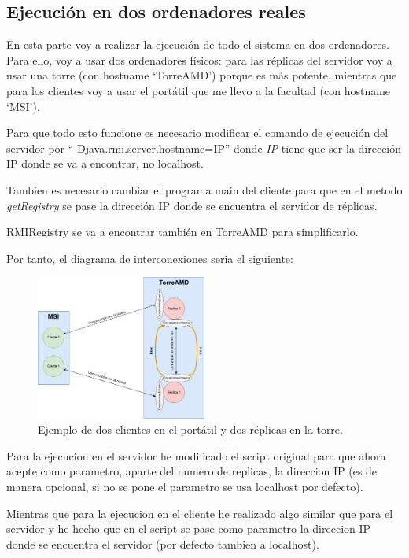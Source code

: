 \documentclass{article}
\begin{document}
\subsection{Ejecución en dos ordenadores reales}
En esta parte voy a realizar la ejecución de todo el sistema en dos ordenadores. Para ello, voy a usar dos ordenadores físicos: para las réplicas del servidor voy a usar una torre (con hostname `TorreAMD') porque es más potente, mientras que para los clientes voy a usar el portátil que me llevo a la facultad (con hostname `MSI').

Para que todo esto funcione es necesario modificar el comando de ejecución del servidor por ``-Djava.rmi.server.hostname=IP'' donde \textit{IP} tiene que ser la dirección IP donde se va a encontrar, no localhost.

Tambien es necesario cambiar el programa main del cliente para que en el metodo \textit{getRegistry} se pase la dirección IP donde se encuentra el servidor de réplicas.

RMIRegistry se va a encontrar también en TorreAMD para simplificarlo.

Por tanto, el diagrama de interconexiones seria el siguiente:

\begin{figure}[H]
    \centering
    \includegraphics[width=0.5\textwidth]{imagenes/variosOrdenadores.png}
    \caption{Ejemplo de dos clientes en el portátil y dos réplicas en la torre.}
\end{figure}

Para la ejecucion en el servidor he modificado el script original para que ahora acepte como parametro, aparte del numero de replicas, la direccion IP (es de manera opcional, si no se pone el parametro se usa localhost por defecto).

Mientras que para la ejecucion en el cliente he realizado algo similar que para el servidor y he hecho que en el script se pase como parametro la direccion IP donde se encuentra el servidor (por defecto tambien a localhost).
\end{document}
